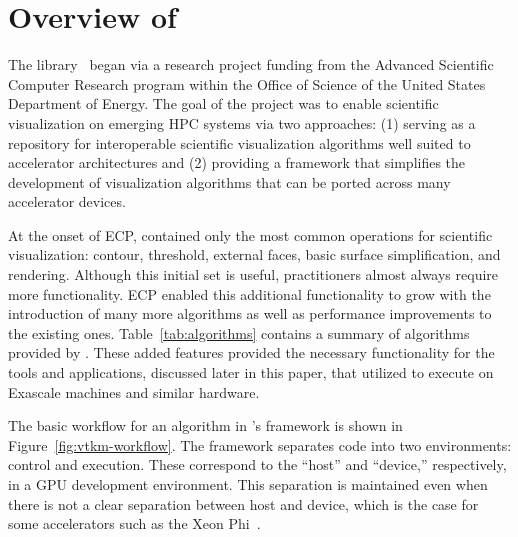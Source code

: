 \section{Overview of \vtkm}


The \vtkm library~\cite{Moreland2016} began via a research project funding
from the 
Advanced Scientific Computer Research program within the Office of Science of the
United States Department of Energy.
The goal of the project was to enable scientific visualization on emerging HPC systems via
two approaches:
(1) serving as a repository for interoperable scientific visualization algorithms well suited to accelerator architectures and (2) providing a framework that simplifies the development of visualization algorithms that can be ported across many accelerator devices.



At the onset of ECP, \vtkm contained only the most common operations for scientific visualization: contour, threshold, external faces, basic surface simplification, and rendering.
Although this initial set is useful, practitioners almost always require more functionality.
ECP enabled this additional functionality to grow with the introduction of many more algorithms as well as performance improvements to the existing ones.
Table~\ref{tab:algorithms} contains a summary of algorithms provided by \vtkm.
These added features provided the necessary functionality for the tools and applications, discussed later in this paper, that utilized \vtkm to execute on Exascale machines and similar hardware.


The basic workflow for an algorithm in \vtkm's framework is shown in Figure~\ref{fig:vtkm-workflow}.
The framework separates code into two environments: control and execution.
These correspond to the ``host'' and ``device,'' respectively, in a GPU development environment.
This separation is maintained even when 
there is not a clear separation between host and device, which is the case for some accelerators such as the Xeon Phi~\cite{Jeffers2016}.


